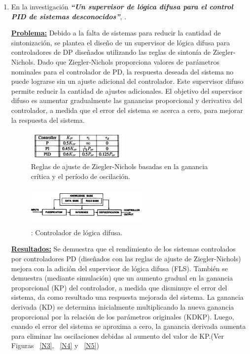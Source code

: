 \documentclass[10pt,conference]{IEEEtran}
\begin{document}
\begin{enumerate}
\item En la investigación \textit{\textbf{“Un supervisor de lógica difusa para el control PID de sistemas desconocidos”}}, \citep{copeland1994fuzzy}.\par
\textbf{\underline{Problema:}}
Debido a la falta de sistemas para reducir la cantidad de sintonización, se plantea el diseño de un supervisor de lógica difusa para controladores de DP diseñados utilizando las reglas de sintonía de Ziegler-Nichols. Dado que Ziegler-Nichols proporciona valores de parámetros nominales para el controlador de PD, la respuesta deseada del sistema no puede lograrse sin un ajuste adicional del controlador. Este supervisor difuso permite reducir la cantidad de ajustes adicionales. El objetivo del supervisor difuso es aumentar gradualmente las ganancias proporcional y derivativa del controlador, a medida que el error del sistema se acerca a cero, para mejorar la respuesta del sistema. 
    \begin{figure}[H]
    \begin{center}
    \includegraphics[width=5cm,height=1.5cm]{figuras/N1.JPG}
    \caption{Reglas de ajuste de Ziegler-Nichols basadas en la ganancia crítica y el período de oscilación.}
    \label{N1} 
    \end{center}
    \end{figure}

    \begin{figure}[H]
    \begin{center}
    \includegraphics[width=6cm,height=2cm]{figuras/N2.JPG}
    \caption{: Controlador de lógica difusa.}
    \label{N2} 
    \end{center}
    \end{figure}

\textbf{\underline{Resultados:}}
Se demuestra que el rendimiento de los sistemas controlados por controladores PD (diseñados con las reglas de ajuste de Ziegler-Nichols) mejora con la adición del supervisor de lógica difusa (FLS). También se demuestra (mediante simulación) que un aumento gradual en la ganancia proporcional (KP) del controlador, a medida que disminuye el error del sistema, da como resultado una respuesta mejorada del sistema. La ganancia derivada (KD) se determina inicialmente multiplicando la nueva ganancia proporcional por la relación de los parámetros originales (KDKP). Luego, cuando el error del sistema se aproxima a cero, la ganancia derivada aumenta para eliminar las oscilaciones debidas al aumento del valor de KP.(Ver Figuras ~\ref{N3}, ~\ref{N4} y ~\ref{N5})


\end{enumerate}
\end{document}

